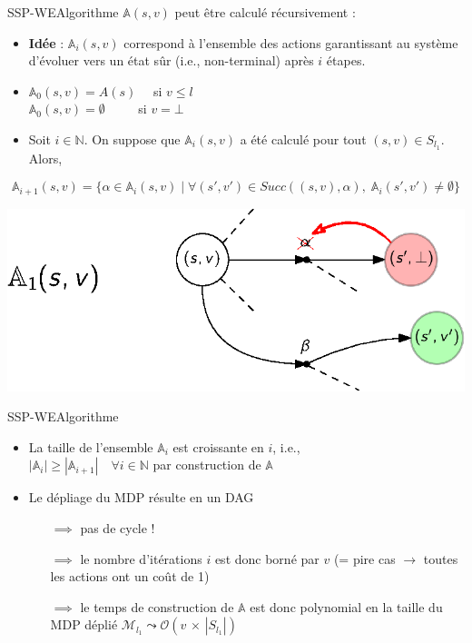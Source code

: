 \documentclass[compress]{beamer}
\theoremstyle{theorem}%
\begin{document}
\begin{frame}{SSP-WE}{Algorithme}
\footnotesize
$\mathbb{A}(s, v)$ peut être calculé récursivement :
\begin{itemize}
  \item \textbf{\color{fibeamer@orange}Idée} : $\mathbb{A}_i(s, v)$ correspond à l'ensemble des actions garantissant au système d'évoluer vers un état sûr (i.e., non-terminal) après $i$ étapes.
  \item $\mathbb{A}_0(s, v) = A(s) \quad $ si $v \leq l$ \\
        $\mathbb{A}_0(s, v) = \emptyset \quad \quad \;$ si $v = \bot$
  \item Soit $i \in \mathbb{N}$. On suppose que $\mathbb{A}_i(s, v)$ a été
    calculé pour tout $(s, v) \in S_{l_1}$. Alors,
\end{itemize}
{
    \[
      \mathbb{A}_{i+1}(s, v) = \{ \alpha \in \mathbb{A}_i(s, v) \; | \;
        \forall (s', v') \in Succ( (s, v), \alpha ), \; \mathbb{A}_i(s', v') \neq \emptyset \}
    \]
}
\begin{center}
  \includegraphics[width=0.5\linewidth]{resources/attractor}
\end{center}
\end{frame}

\begin{frame}{SSP-WE}{Algorithme}
  \begin{itemize}
    \item La taille de l'ensemble $\mathbb{A}_i$ est croissante en $i$, i.e., \\
      $|\mathbb{A}_{i}| \geq |\mathbb{A}_{i+1}| \quad \forall i \in \mathbb{N}$ par construction de $\mathbb{A}$
    \item Le dépliage du MDP résulte en un DAG
    \begin{itemize}
      \item[$\implies$] pas de cycle !
      \item[$\implies$] le nombre d'itérations $i$ est donc borné par $v$ (= pire cas $\rightarrow$ toutes les actions ont un coût de 1)
      \item[$\implies$] le temps de construction de $\mathbb{A}$ est donc polynomial en la taille du MDP déplié $\mathcal{M}_{l_1} \leadsto \mathcal{O}(v \, \times \, |S_{l_1}|)$
    \end{itemize}
  \end{itemize}
\end{frame}
\end{document}
